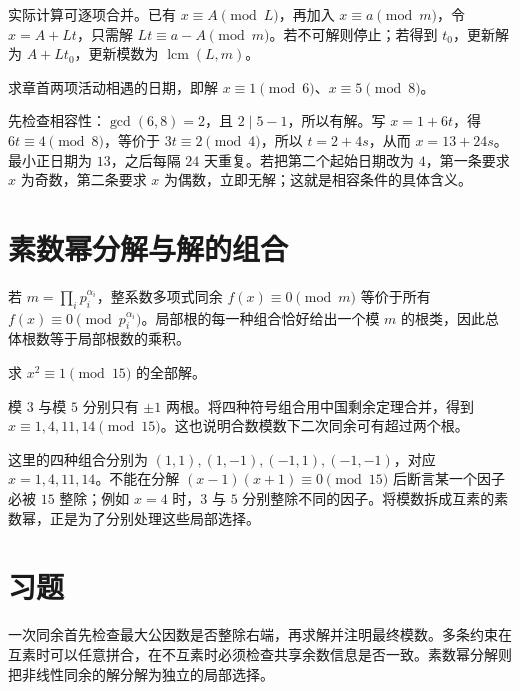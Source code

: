 实际计算可逐项合并。已有 $x\equiv A\pmod L$，再加入 $x\equiv a\pmod m$，令 $x=A+Lt$，只需解 $Lt\equiv a-A\pmod m$。若不可解则停止；若得到 $t_0$，更新解为 $A+Lt_0$，更新模数为 $\operatorname{lcm}(L,m)$。

\begin{example}[有公共因子的两条周期约束]
求章首两项活动相遇的日期，即解 $x\equiv1\pmod6$、$x\equiv5\pmod8$。
\end{example}
\begin{solve}
先检查相容性：$\gcd(6,8)=2$，且 $2\mid5-1$，所以有解。写 $x=1+6t$，得 $6t\equiv4\pmod8$，等价于 $3t\equiv2\pmod4$，所以 $t=2+4s$，从而 $x=13+24s$。最小正日期为 $13$，之后每隔 $24$ 天重复。若把第二个起始日期改为 $4$，第一条要求 $x$ 为奇数，第二条要求 $x$ 为偶数，立即无解；这就是相容条件的具体含义。
\end{solve}

\section{素数幂分解与解的组合}

若 $m=\prod_i p_i^{\alpha_i}$，整系数多项式同余 $f(x)\equiv0\pmod m$ 等价于所有 $f(x)\equiv0\pmod{p_i^{\alpha_i}}$。局部根的每一种组合恰好给出一个模 $m$ 的根类，因此总体根数等于局部根数的乘积。

\begin{example}
求 $x^2\equiv1\pmod{15}$ 的全部解。
\end{example}
\begin{solve}
模 $3$ 与模 $5$ 分别只有 $\pm1$ 两根。将四种符号组合用中国剩余定理合并，得到 $x\equiv1,4,11,14\pmod{15}$。这也说明合数模数下二次同余可有超过两个根。
\end{solve}

这里的四种组合分别为 $(1,1),(1,-1),(-1,1),(-1,-1)$，对应 $x=1,4,11,14$。不能在分解 $(x-1)(x+1)\equiv0\pmod{15}$ 后断言某一个因子必被 $15$ 整除；例如 $x=4$ 时，$3$ 与 $5$ 分别整除不同的因子。将模数拆成互素的素数幂，正是为了分别处理这些局部选择。

\section{习题}

一次同余首先检查最大公因数是否整除右端，再求解并注明最终模数。多条约束在互素时可以任意拼合，在不互素时必须检查共享余数信息是否一致。素数幂分解则把非线性同余的解分解为独立的局部选择。

